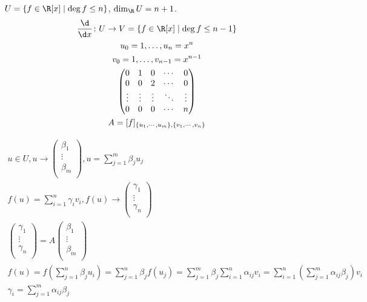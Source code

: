 \begin{exmp}
	$U = \{f \in \R[x] \mid \deg f \le n\}$, $\dim_{\R}U = n + 1$.
	\begin{gather*}
		\frac{\d}{\d x}\colon U \to V = \{f \in \R[x] \mid \deg f \le n - 1\} \\
		u_0 = 1, \dots, u_n = x^n \\
		v_0 = 1, \dots, v_{n - 1} = x^{n - 1} \\
		\begin{pmatrix}
			0 & 1 & 0 & \cdots & 0 \\
			0 & 0 & 2 & \cdots & 0 \\
			\vdots&\vdots&\vdots&\ddots&\vdots \\
			0 & 0 & 0 & \cdots & n \\
		\end{pmatrix} \\
		A = [f]_{\{u_1, \cdots, u_m\}, \{v_1, \cdots, v_n\}}
	\end{gather*}
\end{exmp}

\begin{Rem}
	\begin{gather*}
		u \in U, u \to \begin{pmatrix}
			\beta_1 \\
			\vdots \\
			\beta_m \\
		\end{pmatrix}, u = \sum_{j = 1}^m\beta_ju_j \\
		f(u) = \sum_{i = 1}^n\gamma_iv_i, f(u) \to \begin{pmatrix}
			\gamma_1 \\
			\vdots \\
			\gamma_n \\
		\end{pmatrix} \\
		\begin{pmatrix}
			\gamma_1 \\
			\vdots \\
			\gamma_n \\
		\end{pmatrix}
		= A
		\begin{pmatrix}
			\beta_1 \\
			\vdots \\
			\beta_m \\
		\end{pmatrix} \\
		f(u) = f\left(\sum_{j = 1}^n\beta_ju_i\right) = \sum_{j = 1}^n\beta_jf(u_j)
		= \sum_{j = 1}^m\beta_j \sum_{i = 1}^n\alpha_{ij}v_i = \sum_{i = 1}^n\left(\sum_{j = 1}^m\alpha_{ij}\beta_j\right) v_i \\
		\gamma_i = \sum_{j = 1}^m\alpha_{ij}\beta_j 
	\end{gather*}
\end{Rem}

